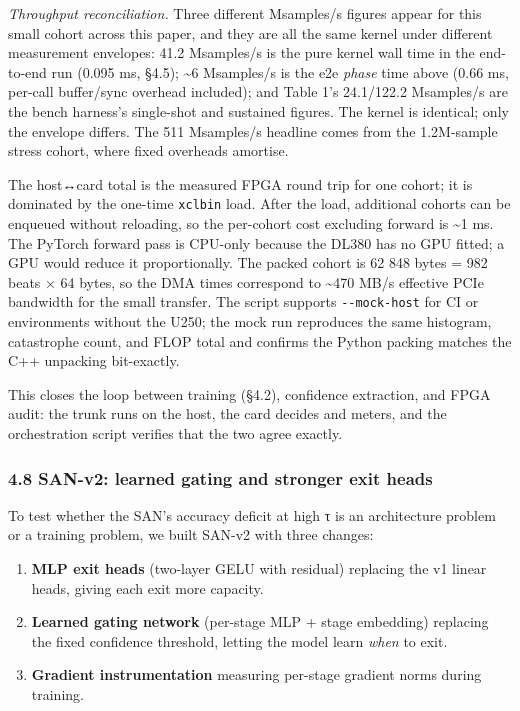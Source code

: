 \documentclass[
]{article}
\providecommand{\tightlist}{%
  \setlength{\itemsep}{0pt}\setlength{\parskip}{0pt}}
\begin{document}
\emph{Throughput reconciliation.} Three different Msamples/s figures
appear for this small cohort across this paper, and they are all the
same kernel under different measurement envelopes: 41.2 Msamples/s is
the pure kernel wall time in the end-to-end run (0.095 ms, §4.5);
\textasciitilde6 Msamples/s is the e2e \emph{phase} time above (0.66 ms,
per-call buffer/sync overhead included); and Table 1's 24.1/122.2
Msamples/s are the bench harness's single-shot and sustained figures.
The kernel is identical; only the envelope differs. The 511 Msamples/s
headline comes from the 1.2M-sample stress cohort, where fixed overheads
amortise.

The host↔card total is the measured FPGA round trip for one cohort; it
is dominated by the one-time \texttt{xclbin} load. After the load,
additional cohorts can be enqueued without reloading, so the per-cohort
cost excluding forward is \textasciitilde1 ms. The PyTorch forward pass
is CPU-only because the DL380 has no GPU fitted; a GPU would reduce it
proportionally. The packed cohort is 62 848 bytes = 982 beats × 64
bytes, so the DMA times correspond to \textasciitilde470 MB/s effective
PCIe bandwidth for the small transfer. The script supports
\texttt{-\/-mock-host} for CI or environments without the U250; the mock
run reproduces the same histogram, catastrophe count, and FLOP total and
confirms the Python packing matches the C++ unpacking bit-exactly.

This closes the loop between training (§4.2), confidence extraction, and
FPGA audit: the trunk runs on the host, the card decides and meters, and
the orchestration script verifies that the two agree exactly.

\hypertarget{san-v2-learned-gating-and-stronger-exit-heads}{%
\subsubsection{4.8 SAN-v2: learned gating and stronger exit
heads}\label{san-v2-learned-gating-and-stronger-exit-heads}}

To test whether the SAN's accuracy deficit at high τ is an architecture
problem or a training problem, we built SAN-v2 with three changes:

\begin{enumerate}
\def\labelenumi{\arabic{enumi}.}
\tightlist
\item
  \textbf{MLP exit heads} (two-layer GELU with residual) replacing the
  v1 linear heads, giving each exit more capacity.
\item
  \textbf{Learned gating network} (per-stage MLP + stage embedding)
  replacing the fixed confidence threshold, letting the model learn
  \emph{when} to exit.
\item
  \textbf{Gradient instrumentation} measuring per-stage gradient norms
  during training.
\end{enumerate}
\end{document}
